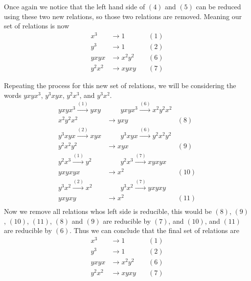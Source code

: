 \documentclass[10pt]{amsart}
\theoremstyle{definition}
\begin{document}
Once again we notice that the left hand side of $(4)$ and $(5)$ can be reduced
using these two new relations, so those two relations are removed. Meaning our
set of relations is now
\begin{align*}
  x^3&\rightarrow1\quad&(1)\\
  y^3&\rightarrow1\quad&(2)\\
  yxyx&\rightarrow x^2y^2\quad&(6)\\
  y^2x^2&\rightarrow xyxy\quad&(7)
\end{align*}

Repeating the process for this new set of relations, we will be considering the
words $yxyx^3$, $y^3xyx$, $y^2x^3$, and $y^3x^2$.
\begin{align*}
  yxyx^3\xrightarrow{(1)}yxy&\quad\quad
  yxyx^3\xrightarrow{(6)}x^2y^2x^2\\
  x^2y^2x^2&\rightarrow yxy\quad&(8)\\
  y^3xyx\xrightarrow{(2)}xyx&\quad\quad
  y^3xyx\xrightarrow{(6)}y^2x^2y^2\\
  y^2x^2y^2&\rightarrow xyx\quad&(9)\\
  y^2x^3\xrightarrow{(1)}y^2&\quad\quad
  y^2x^3\xrightarrow{(7)} xyxyx\\
  yxyxyx&\rightarrow x^2\quad&(10)\\
  y^3x^2\xrightarrow{(2)}x^2&\quad\quad
  y^3x^2\xrightarrow{(7)}yxyxy\\
  yxyxy&\rightarrow x^2\quad&(11)\\
\end{align*}
Now we remove all relations whos left side is reducible, this would be $(8)$,
$(9)$, $(10)$, $(11)$, $(8)$ and $(9)$ are reducible by $(7)$, and $(10)$, and
$(11)$ are reducible by $(6)$. Thus we can conclude that the final set of
relations are
\begin{align*}
  x^3&\rightarrow1\quad&(1)\\
  y^3&\rightarrow1\quad&(2)\\
  yxyx&\rightarrow x^2y^2\quad&(6)\\
  y^2x^2&\rightarrow xyxy\quad&(7)
\end{align*}

\nocite{*}


\end{document}
